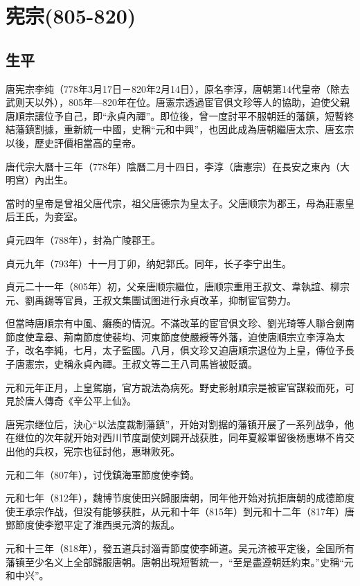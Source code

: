 
\section{宪宗\tiny(805-820)}

\subsection{生平}

唐宪宗李纯（778年3月17日－820年2月14日），原名李淳，唐朝第14代皇帝（除去武则天以外），805年—820年在位。唐憲宗透過宦官俱文珍等人的協助，迫使父親唐順宗讓位予自己，即“永貞內禪”。即位後，曾一度討平不服朝廷的藩鎮，短暫終結藩鎮割據，重新統一中國，史稱“元和中興”，也因此成為唐朝繼唐太宗、唐玄宗以後，歷史評價相當高的皇帝。

唐代宗大曆十三年（778年）陰曆二月十四日，李淳（唐憲宗）在長安之東內（大明宫）內出生。

當时的皇帝是曾祖父唐代宗，祖父唐德宗为皇太子。父唐顺宗为郡王，母為莊憲皇后王氏，为妾室。

貞元四年（788年），封為广陵郡王。

貞元九年（793年）十一月丁卯，纳妃郭氏。同年，长子李宁出生。

貞元二十一年（805年）初，父亲唐顺宗繼位，唐顺宗重用王叔文、韋執誼、柳宗元、劉禹錫等官員，王叔文集團试图进行永貞改革，抑制宦官勢力。

但當時唐順宗有中風、癱瘓的情況。不滿改革的宦官俱文珍、劉光琦等人聯合劍南節度使韋皋、荊南節度使裴均、河東節度使嚴綬等外藩，迫使唐順宗立李淳為太子，改名李純，七月，太子監國。八月，俱文珍又迫唐順宗退位为上皇，傳位予長子唐憲宗，史稱永貞內禪。王叔文等二王八司馬皆被貶謫。

元和元年正月，上皇駕崩，官方說法為病死。野史影射順宗是被宦官謀殺而死，可見於唐人傳奇《辛公平上仙》。

唐宪宗继位后，決心“以法度裁制藩鎮”，开始对割据的藩镇开展了一系列战争，他在继位的次年就开始对西川节度副使刘闢开战获胜，同年夏綏軍留後杨惠琳不肯交出他的兵权，宪宗也征討他，惠琳败死。

元和二年（807年），讨伐鎮海軍節度使李錡。

元和七年（812年），魏博节度使田兴歸服唐朝，同年他开始对抗拒唐朝的成德節度使王承宗作战，但没有能够获胜，从元和十年（815年）到元和十二年（817年）唐鄧節度使李愬平定了淮西吳元濟的叛乱。

元和十三年（818年），發五道兵討淄青節度使李師道。吴元济被平定後，全国所有藩镇至少名义上全部歸服唐朝。唐朝出現短暫統一，“至是盡遵朝廷約束。”史稱“元和中兴”。

